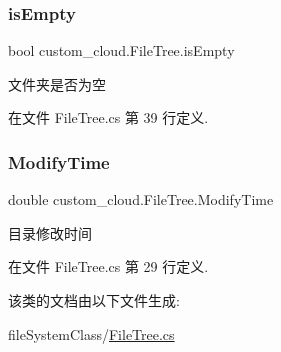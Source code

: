 \subsubsection{\texorpdfstring{is\+Empty}{isEmpty}}
{\footnotesize\ttfamily bool custom\+\_\+cloud.\+File\+Tree.\+is\+Empty\hspace{0.3cm}{\ttfamily [get]}}



文件夹是否为空 



在文件 File\+Tree.\+cs 第 39 行定义.

\mbox{\label{classcustom__cloud_1_1_file_tree_a4483b47b27bbca29ce30e468a19249ee}} 
\subsubsection{\texorpdfstring{Modify\+Time}{ModifyTime}}
{\footnotesize\ttfamily double custom\+\_\+cloud.\+File\+Tree.\+Modify\+Time\hspace{0.3cm}{\ttfamily [get]}}



目录修改时间 



在文件 File\+Tree.\+cs 第 29 行定义.



该类的文档由以下文件生成\+:\begin{DoxyCompactItemize}
\item 
file\+System\+Class/\hyperlink{_file_tree_8cs}{File\+Tree.\+cs}\end{DoxyCompactItemize}
